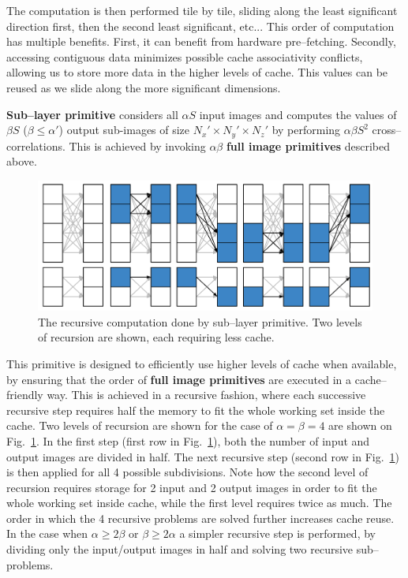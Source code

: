   The computation is then performed tile by tile, sliding along the
  least significant direction first, then the second least
  significant, etc...  This order of computation has multiple
  benefits.  First, it can benefit from hardware pre--fetching.
  Secondly, accessing contiguous data minimizes possible cache
  associativity conflicts, allowing us to store more data in the
  higher levels of cache.  This values can be reused as we slide along
  the more significant dimensions.

  {\bf Sub--layer primitive} considers all $\alpha S$ input images and
  computes the values of $\beta S$ ($\beta \le \alpha'$) output
  sub-images of size $N_x' \times N_y' \times N_z'$ by performing
  $\alpha \beta S^2$ cross--correlations.  This is achieved by invoking
  $\alpha \beta$ {\bf full image primitives} described above.

  \begin{figure}
    \begin{center}
      \includegraphics[width=0.8\linewidth]{fig/serialexec}
    \end{center}
    \caption{The recursive computation done by sub--layer primitive.
      Two levels of recursion are shown, each requiring less cache. }
    \label{fig:full-exec}
  \end{figure}

  This primitive is designed to efficiently use higher levels of cache
  when available, by ensuring that the order of {\bf full image
    primitives} are executed in a cache--friendly way.  This is
  achieved in a recursive fashion, where each successive recursive
  step requires half the memory to fit the whole working set inside
  the cache.  Two levels of recursion are shown for the case of
  $\alpha = \beta = 4$ are shown on Fig.~\ref{fig:full-exec}.  In the
  first step (first row in Fig.~\ref{fig:full-exec}), both the number
  of input and output images are divided in half.  The next recursive
  step (second row in Fig.~\ref{fig:full-exec}) is then applied for
  all 4 possible subdivisions.  Note how the second level of recursion
  requires storage for 2 input and 2 output images in order to fit the
  whole working set inside cache, while the first level requires twice
  as much.  The order in which the 4 recursive problems are solved
  further increases cache reuse.  In the case when $\alpha \ge 2\beta$
  or $\beta \ge 2\alpha$ a simpler recursive step is performed, by
  dividing only the input/output images in half and solving two
  recursive sub--problems.

